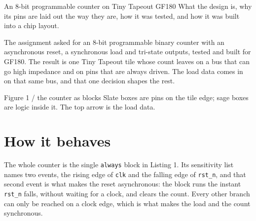 \documentclass[11pt]{article}
\begin{document}
%
{An 8-bit programmable counter on Tiny Tapeout GF180}%
{What the design is, why its pins are laid out the way they are, how it was tested, and how it was built into a chip layout.}

The assignment asked for an 8-bit programmable binary counter with an asynchronous reset, a
synchronous load and tri-state outputs, tested and built for GF180. The result is one Tiny
Tapeout tile whose count leaves on a bus that can go high impedance and on pins that are always
driven. The load data comes in on that same bus, and that one decision shapes the rest.

\begin{hsfigure}{Figure 1 / the counter as blocks}%
{Slate boxes are pins on the tile edge; sage boxes are logic inside it. The top arrow is the load data.}
\hsnodesize{84pt}{52pt}
\end{hsfigure}

\newpage

\section{How it behaves}\label{sec:behaviour}

The whole counter is the single \texttt{always} block in Listing 1. Its sensitivity list names
two events, the rising edge of \texttt{clk} and the falling edge of \texttt{rst\_n}, and that
second event is what makes the reset asynchronous: the block runs the instant \texttt{rst\_n}
falls, without waiting for a clock, and clears the count. Every other branch can only be reached
on a clock edge, which is what makes the load and the count synchronous.
\end{document}
